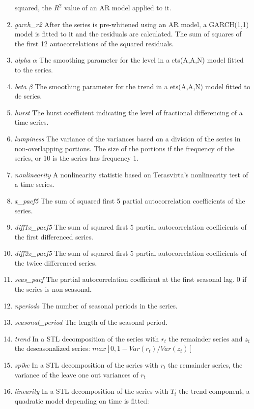\documentclass[11pt,a4paper,]{article}
\theoremstyle{definition}
\theoremstyle{definition}
\theoremstyle{definition}
\theoremstyle{remark}
\begin{document}
\begin{enumerate}
  squared, the \(R^2\) value of an AR model applied to it.
\item
  \emph{garch\_r2} After the series is pre-whitened using an AR model, a
  GARCH(1,1) model is fitted to it and the residuals are calculated. The
  sum of squares of the first 12 autocorrelations of the squared
  residuals.
\item
  \emph{alpha} \(\alpha\) The smoothing parameter for the level in a
  ets(A,A,N) model fitted to the series.
\item
  \emph{beta} \(\beta\) The smoothing parameter for the trend in a
  ets(A,A,N) model fitted to de series.
\item
  \emph{hurst} The hurst coefficient indicating the level of fractional
  differencing of a time series.
\item
  \emph{lumpiness} The variance of the variances based on a division of
  the series in non-overlapping portions. The size of the portions if
  the frequency of the series, or 10 is the series has frequency 1.
\item
  \emph{nonlinearity} A nonlinearity statistic based on Terasvirta's
  nonlinearity test of a time series.
\item
  \emph{x\_pacf5} The sum of squared first 5 partial autocorrelation
  coefficients of the series.
\item
  \emph{diff1x\_pacf5} The sum of squared first 5 partial
  autocorrelation coefficients of the first differenced series.
\item
  \emph{diff2x\_pacf5} The sum of squared first 5 partial
  autocorrelation coefficients of the twice differenced series.
\item
  \emph{seas\_pacf} The partial autocorrelation coefficient at the first
  seasonal lag. 0 if the series is non seasonal.
\item
  \emph{nperiods} The number of seasonal periods in the series.
\item
  \emph{seasonal\_period} The length of the seasonal period.
\item
  \emph{trend} In a STL decomposition of the series with \(r_t\) the
  remainder series and \(z_t\) the deseasonalized series:
  \(max[0, 1- Var(r_t) / Var(z_t)]\)
\item
  \emph{spike} In a STL decomposition of the series with \(r_t\) the
  remainder series, the variance of the leave one out variances of
  \(r_t\)
\item
  \emph{linearity} In a STL decomposition of the series with \(T_t\) the
  trend component, a quadratic model depending on time is fitted:

\end{enumerate}
\end{document}
